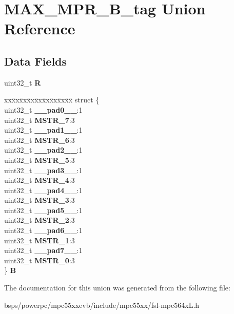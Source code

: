 \hypertarget{unionMAX__MPR__32B__tag}{}\section{M\+A\+X\+\_\+\+M\+P\+R\+\_\+B\+\_\+tag Union Reference}
\label{unionMAX__MPR__32B__tag}
\subsection*{Data Fields}
\begin{DoxyCompactItemize}
\item 
\mbox{\label{unionMAX__MPR__32B__tag_a6de275e8174c90eed8cba84fb2249eb5}} 
uint32\+\_\+t {\bfseries R}
\item 
\mbox{\label{unionMAX__MPR__32B__tag_a1e50fe36fce89177ea6bbf085c83bfe5}} 
\begin{tabbing}
xx\=xx\=xx\=xx\=xx\=xx\=xx\=xx\=xx\=\kill
struct \{\\
\>uint32\_t {\bfseries \_\_pad0\_\_}:1\\
\>uint32\_t {\bfseries MSTR\_7}:3\\
\>uint32\_t {\bfseries \_\_pad1\_\_}:1\\
\>uint32\_t {\bfseries MSTR\_6}:3\\
\>uint32\_t {\bfseries \_\_pad2\_\_}:1\\
\>uint32\_t {\bfseries MSTR\_5}:3\\
\>uint32\_t {\bfseries \_\_pad3\_\_}:1\\
\>uint32\_t {\bfseries MSTR\_4}:3\\
\>uint32\_t {\bfseries \_\_pad4\_\_}:1\\
\>uint32\_t {\bfseries MSTR\_3}:3\\
\>uint32\_t {\bfseries \_\_pad5\_\_}:1\\
\>uint32\_t {\bfseries MSTR\_2}:3\\
\>uint32\_t {\bfseries \_\_pad6\_\_}:1\\
\>uint32\_t {\bfseries MSTR\_1}:3\\
\>uint32\_t {\bfseries \_\_pad7\_\_}:1\\
\>uint32\_t {\bfseries MSTR\_0}:3\\
\} {\bfseries B}\\

\end{tabbing}\end{DoxyCompactItemize}


The documentation for this union was generated from the following file\+:\begin{DoxyCompactItemize}
\item 
bsps/powerpc/mpc55xxevb/include/mpc55xx/fsl-\/mpc564x\+L.\+h\end{DoxyCompactItemize}
